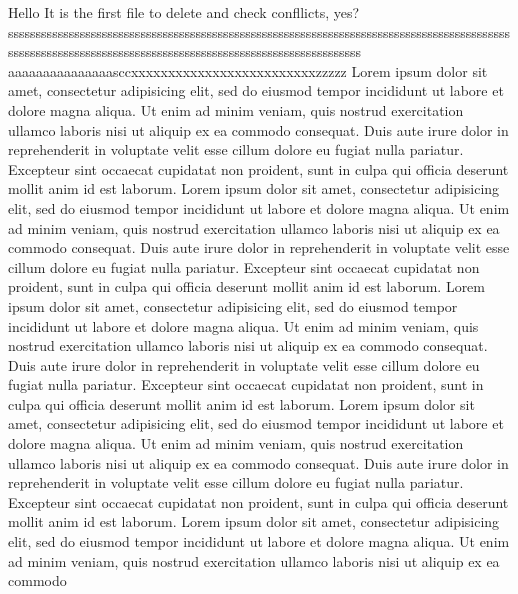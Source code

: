 Hello
It is the
first file
to delete and check confllicts, yes?
\begin{equation}
    
\end{equation}
sssssssssssssssssssssssssssssssssssssssssssssssssssssssssssssssssssssssssssssssssssssssssssssssssssssssssssssssssssssssssssssssssssssssssssssssssssssssssss aaaaaaaaaaaaaaasccxxxxxxxxxxxxxxxxxxxxxxxxxzzzzz
       Lorem ipsum dolor sit amet, consectetur adipisicing elit, sed do eiusmod
       tempor incididunt ut labore et dolore magna aliqua. Ut enim ad minim veniam,
       quis nostrud exercitation ullamco laboris nisi ut aliquip ex ea commodo
       consequat. Duis aute irure dolor in reprehenderit in voluptate velit esse
       cillum dolore eu fugiat nulla pariatur. Excepteur sint occaecat cupidatat non
proident, sunt in culpa qui officia deserunt mollit anim id est laborum.
Lorem ipsum dolor sit amet, consectetur adipisicing elit, sed do eiusmod
tempor incididunt ut labore et dolore magna aliqua. Ut enim ad minim veniam,
       quis nostrud exercitation ullamco laboris nisi ut aliquip ex ea commodo
       consequat. Duis aute irure dolor in reprehenderit in voluptate velit esse
       cillum dolore eu fugiat nulla pariatur. Excepteur sint occaecat cupidatat non
       proident, sunt in culpa qui officia deserunt mollit anim id est laborum.
       Lorem ipsum dolor sit amet, consectetur adipisicing elit, sed do eiusmod
       tempor incididunt ut labore et dolore magna aliqua. Ut enim ad minim veniam,
       quis nostrud exercitation ullamco laboris nisi ut aliquip ex ea commodo
       consequat. Duis aute irure dolor in reprehenderit in voluptate velit esse
       cillum dolore eu fugiat nulla pariatur. Excepteur sint occaecat cupidatat non
       proident, sunt in culpa qui officia deserunt mollit anim id est laborum.
       Lorem ipsum dolor sit amet, consectetur adipisicing elit, sed do eiusmod
       tempor incididunt ut labore et dolore magna aliqua. Ut enim ad minim veniam,
       quis nostrud exercitation ullamco laboris nisi ut aliquip ex ea commodo
       consequat. Duis aute irure dolor in reprehenderit in voluptate velit esse
       cillum dolore eu fugiat nulla pariatur. Excepteur sint occaecat cupidatat non
       proident, sunt in culpa qui officia deserunt mollit anim id est laborum.
       Lorem ipsum dolor sit amet, consectetur adipisicing elit, sed do eiusmod
       tempor incididunt ut labore et dolore magna aliqua. Ut enim ad minim veniam,
       quis nostrud exercitation ullamco laboris nisi ut aliquip ex ea commodo
